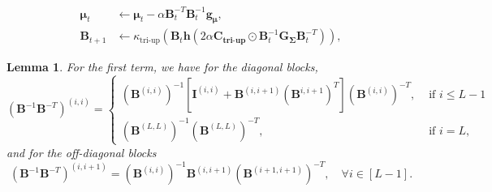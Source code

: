 \documentclass[a4paper, 11pt, oneside]{scrartcl}
\theoremstyle{break}
\newtheorem{lemma}{Lemma}[section]
\newcommand{\matr}[1]{\boldsymbol{#1}}
\numberwithin{equation}{section}
\begin{document}
				\begin{align}
					\matr{\mu}_{t} & \leftarrow \matr{\mu}_t - \alpha \matr{B}_t^{-T} \matr{B}_t^{-1} \matr{g_{\mu}}, \\
					\matr{B}_{t+1} & \leftarrow \kappa_{\text{tri-up}} (\matr{B}_t \matr{h}(2 \alpha \matr{C_{\text{tri-up}}} \odot \matr{B}_t^{-1} \matr{G_{\Sigma}} \matr{B}_t^{-T})),
				\end{align}

				\begin{lemma}
					For the first term, we have for the diagonal blocks,
					\begin{equation}
						\left( \matr{B}^{-1} \matr{B}^{-T} \right)^{(i, i)} = 
						\begin{cases}
							\left( \matr{B}^{(i, i)} \right)^{-1} \left[ \matr{I}^{(i, i)} + \matr{B}^{(i, i+1)} \left( \matr{B}^{i, i+1} \right)^T \right] \left( \matr{B}^{(i, i)} \right)^{-T}, &\text{ if } i \le L - 1 \\
							\left( \matr{B}^{(L, L)} \right)^{-1} \left( \matr{B}^{(L, L)} \right)^{-T}, &\text{ if } i = L,
						\end{cases}
					\end{equation}
					and for the off-diagonal blocks
					\begin{equation}
						\left( \matr{B}^{-1} \matr{B}^{-T} \right)^{(i, i+1)} = \left( \matr{B}^{(i, i)} \right)^{-1} \matr{B}^{(i, i+1)} \left(\matr{B}^{(i+1, i+1)} \right)^{-T}, \quad \forall i \in [L-1].
					\end{equation}
				\end{lemma}
\end{document}
